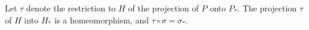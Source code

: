 Let $\tau$ denote the restriction to $H$ of the projection of $P$ onto $P_*$. The projection $\tau$ of $H$ into $H_*$ is a homeomorphism, and $\tau \circ \sigma = \sigma_*$.

